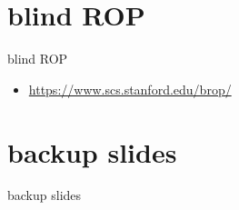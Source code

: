 \section{blind ROP}
\begin{frame}{blind ROP}
    \begin{itemize}
    \item \url{https://www.scs.stanford.edu/brop/}
    \end{itemize}
\end{frame}






%





\section{backup slides}
\begin{frame}{backup slides}
\end{frame}



